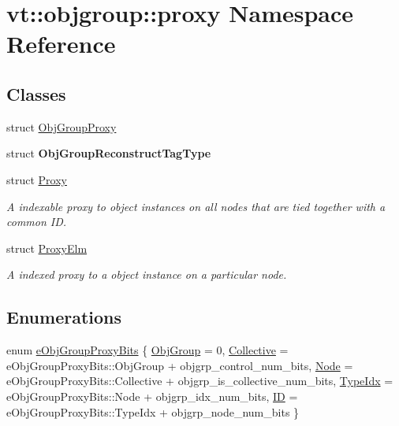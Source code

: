 \hypertarget{namespacevt_1_1objgroup_1_1proxy}{}\section{vt\+:\+:objgroup\+:\+:proxy Namespace Reference}
\label{namespacevt_1_1objgroup_1_1proxy}
\subsection*{Classes}
\begin{DoxyCompactItemize}
\item 
struct \hyperlink{structvt_1_1objgroup_1_1proxy_1_1_obj_group_proxy}{Obj\+Group\+Proxy}
\item 
struct {\bfseries Obj\+Group\+Reconstruct\+Tag\+Type}
\item 
struct \hyperlink{structvt_1_1objgroup_1_1proxy_1_1_proxy}{Proxy}
\begin{DoxyCompactList}\small\item\em A indexable proxy to object instances on all nodes that are tied together with a common ID. \end{DoxyCompactList}\item 
struct \hyperlink{structvt_1_1objgroup_1_1proxy_1_1_proxy_elm}{Proxy\+Elm}
\begin{DoxyCompactList}\small\item\em A indexed proxy to a object instance on a particular node. \end{DoxyCompactList}\end{DoxyCompactItemize}
\subsection*{Enumerations}
\begin{DoxyCompactItemize}
\item 
enum \hyperlink{namespacevt_1_1objgroup_1_1proxy_a5cfde1a666e49070fcc0312e51d53777}{e\+Obj\+Group\+Proxy\+Bits} \{ \newline
\hyperlink{namespacevt_1_1objgroup_1_1proxy_a5cfde1a666e49070fcc0312e51d53777a235be9f56eb1337ea20d2937ffb7a8a4}{Obj\+Group} = 0, 
\hyperlink{namespacevt_1_1objgroup_1_1proxy_a5cfde1a666e49070fcc0312e51d53777ab1d0e2d0ac577126529814c35a32c003}{Collective} = e\+Obj\+Group\+Proxy\+Bits\+:\+:Obj\+Group + objgrp\+\_\+control\+\_\+num\+\_\+bits, 
\hyperlink{namespacevt_1_1objgroup_1_1proxy_a5cfde1a666e49070fcc0312e51d53777a179829552544d5bb4b3bac56d953e06a}{Node} = e\+Obj\+Group\+Proxy\+Bits\+:\+:Collective + objgrp\+\_\+is\+\_\+collective\+\_\+num\+\_\+bits, 
\hyperlink{namespacevt_1_1objgroup_1_1proxy_a5cfde1a666e49070fcc0312e51d53777a3993e012fc4525e4ddc1a6e30a75714c}{Type\+Idx} = e\+Obj\+Group\+Proxy\+Bits\+:\+:Node + objgrp\+\_\+idx\+\_\+num\+\_\+bits, 
\newline
\hyperlink{namespacevt_1_1objgroup_1_1proxy_a5cfde1a666e49070fcc0312e51d53777a6de04ce539708519a851efd1640f2b48}{ID} = e\+Obj\+Group\+Proxy\+Bits\+:\+:Type\+Idx + objgrp\+\_\+node\+\_\+num\+\_\+bits
 \}
\end{DoxyCompactItemize}


